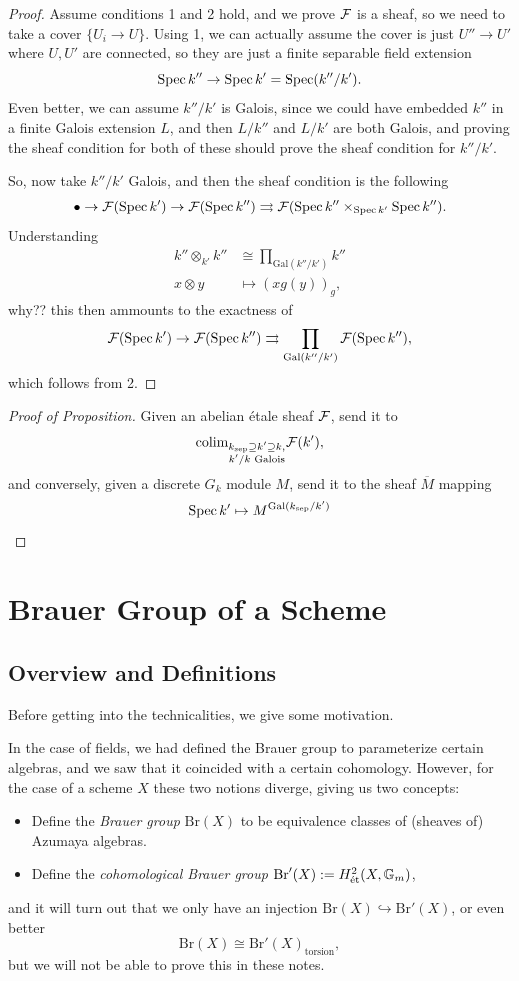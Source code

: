 \documentclass[12pt]{article}
\newcommand{\et}{\text{\'{e}t}}
\newcommand{\G}{\mathbb{G}}
\newcommand{\sep}{\text{sep}}
\newcommand{\Br}{\mathrm{Br}}
\newcommand{\Gal}{\mathrm{Gal}}
\begin{document}
\begin{proof}
    Assume conditions 1 and 2 hold, and we prove $\mathcal{F}$ is a sheaf, so we need to take a cover $\{U_i\to U\}$. Using 1, we can actually assume the cover is just $U''\to U'$ where $U,U'$ are connected, so they are just a finite separable field extension
    \[\operatorname{Spec} k'' \to \operatorname{Spec} k' = \operatorname{Spec} (k''/k').\]
    Even better, we can assume $k''/k'$ is Galois, since we could have embedded $k''$ in a finite Galois extension $L$, and then $L/k''$ and $L/k'$ are both Galois, and proving the sheaf condition for both of these should prove the sheaf condition for $k''/k'$.

    So, now take $k''/k'$ Galois, and then the sheaf condition is the following
    \[\bullet \to \mathcal{F}(\operatorname{Spec} k') \to \mathcal{F}(\operatorname{Spec} k'') \rightrightarrows \mathcal{F}(\operatorname{Spec} k'' \times_{\operatorname{Spec} k'} \operatorname{Spec} k'').\]
    Understanding
    \begin{align*}
        k''\otimes_{k'} k'' &\cong \prod_{\Gal(k''/k')} k''\\
        x\otimes y &\mapsto (xg(y))_g,
    \end{align*}
    {\color{red} why??} this then ammounts to the exactness of
    \[\cF(\Spec k') \to \cF(\Spec k'') \rightrightarrows \prod_{\Gal(k''/k')} \cF(\Spec k''),\]
    which follows from 2.
\end{proof}

\begin{proof}[Proof of Proposition]
    Given an abelian \'etale sheaf $\mathcal{F}$, send it to
    \[\colim_{\substack{k_\sep\supseteq k'\supseteq k,\\ k'/k \text{ Galois}}} \cF(k'),\]
    and conversely, given a discrete $G_k$ module $M$, send it to the sheaf $\overline{M}$ mapping
    \[\Spec k' \mapsto M^{\Gal(k_\sep/k')}\]
\end{proof}



\section{Brauer Group of a Scheme}

\subsection{Overview and Definitions}

Before getting into the technicalities, we give some motivation.

In the case of fields, we had defined the Brauer group to parameterize certain algebras, and we saw that it coincided with a certain cohomology. However, for the case of a scheme $X$ these two notions diverge, giving us two concepts:
\begin{itemize}
    \item Define the \textit{Brauer group} $\Br(X)$ to be equivalence classes of (sheaves of) Azumaya algebras.
    \item Define the \textit{cohomological Brauer group} $\Br'(X) \defeq H^2_\et(X,\G_m)$,
\end{itemize}
and it will turn out that we only have an injection $\Br(X)\hookrightarrow \Br'(X)$, or even better
\[\Br(X) \cong \Br'(X)_{\text{torsion}},\]
but we will not be able to prove this in these notes.
\end{document}
